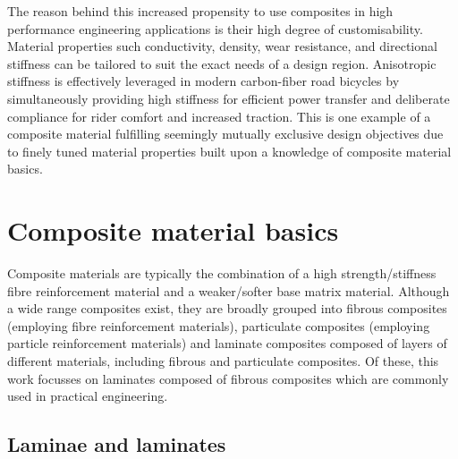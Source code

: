 The reason behind this increased propensity to use composites in high performance engineering applications is their high degree of customisability. Material properties such conductivity, density, wear resistance, and directional stiffness can be tailored to suit the exact needs of a design region. Anisotropic stiffness is effectively leveraged in modern carbon-fiber road bicycles by simultaneously providing high stiffness for efficient power transfer and deliberate compliance for rider comfort and increased traction. This is one example of a composite material fulfilling seemingly mutually exclusive design objectives due to finely tuned material properties built upon a knowledge of composite material basics.

\section{Composite material basics}

Composite materials are typically the combination of a high strength/stiffness fibre reinforcement material and a weaker/softer base matrix material. Although a wide range composites exist, they are broadly grouped into fibrous composites (employing fibre reinforcement materials), particulate composites (employing particle reinforcement materials) and laminate composites composed of layers of different materials, including fibrous and particulate composites. Of these, this work focusses on laminates composed of fibrous composites which are commonly used in practical engineering.

\subsection{Laminae and laminates}

